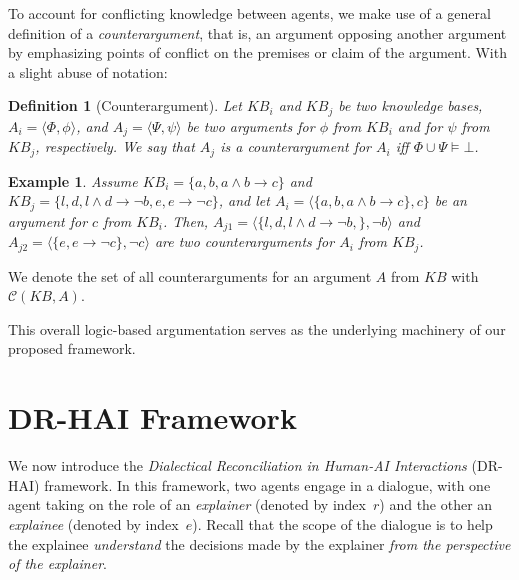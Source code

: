 \documentclass[letterpaper]{article} %
\newtheorem{definition}{{\bf Definition}}
\newtheorem{example}{\bf Example}
\begin{document}
To account for conflicting knowledge between agents, we make use of a general definition of a \emph{counterargument}, that is, an argument opposing another argument by emphasizing points of conflict on the premises or claim of the argument. With a slight abuse of notation:

\begin{definition}[Counterargument]
   Let $KB_i$ and $KB_j$ be two knowledge bases, 
   $A_i = \langle \Phi, \phi \rangle$, and $A_j = \langle \Psi, \psi \rangle$ be two arguments for $\phi$ from $KB_i$ and for $\psi$ from $KB_j$, respectively. We say that $A_j$ is a \emph{counterargument} for $A_i$ iff $\Phi \cup \Psi \models \bot$.
\end{definition}




\begin{example}
\label{ex2}
Assume $KB_i = \{a, b, a \land b \!\rightarrow\!  c \}$ and $KB_j = \{l, d, l \land d \!\rightarrow\! \neg b, e, e \!\rightarrow\! \neg c \}$, and let $A_i = \langle \{a, b, a\land b \!\rightarrow\! c\}, c \}$ be an argument for $c$ from $KB_i$. Then, $A_{j1} = \langle \{l, d, l \land d \!\rightarrow\! \neg b,\},  \neg b \rangle$ and $A_{j2} = \langle \{e, e \!\rightarrow\! \neg c \}, \neg c \rangle$ are two \emph{counterarguments} for $A_i$ from $KB_j$.
\end{example}

\noindent We denote the set of all counterarguments for an argument $A$ from $KB$ with $\mathcal{C}(KB, A)$.



This overall logic-based argumentation serves as the underlying machinery of our proposed framework.


\section{DR-HAI Framework}
\label{drai-frame}




We now introduce the \emph{Dialectical Reconciliation in Human-AI Interactions} (DR-HAI) framework. In this framework, two agents engage in a dialogue, with one agent taking on the role of an \emph{explainer} (denoted by index~$r$) and the other an \emph{explainee} (denoted by index~$e$). Recall that the scope of the dialogue is to help the explainee \emph{understand} the decisions made by the explainer \emph{from the perspective of the explainer}.
\end{document}
